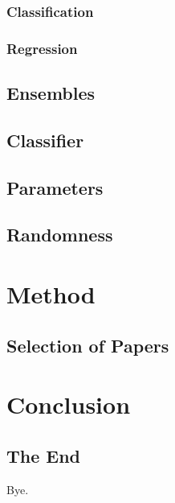 \documentclass[a4paper,jou,12pt,apacite]{apa6}
\begin{document}
\subsubsection{Classification}

\subsubsection{Regression}

\subsection{Ensembles}

\subsection{Classifier}

\subsection{Parameters}

\subsection{Randomness}

\section{Method}

\subsection{Selection of Papers}

\section{Conclusion}

\subsection{The End}
Bye.


\end{document}
